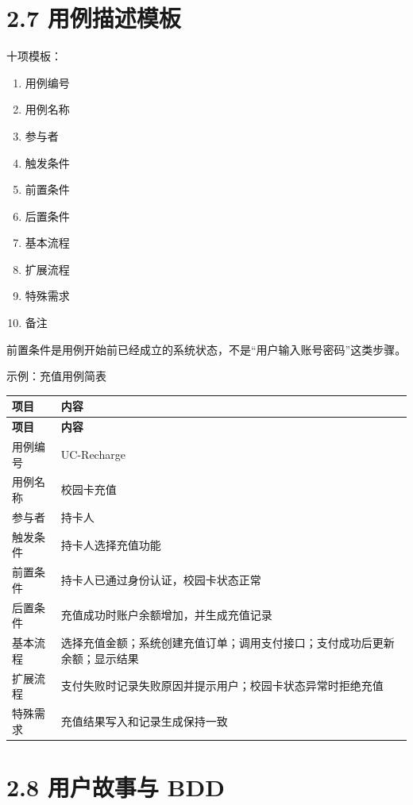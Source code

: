 \documentclass[UTF8,zihao=-4]{ctexart}
\begin{document}
\section{2.7 用例描述模板}

十项模板：

\begin{enumerate}
\item 用例编号
\item 用例名称
\item 参与者
\item 触发条件
\item 前置条件
\item 后置条件
\item 基本流程
\item 扩展流程
\item 特殊需求
\item 备注
\end{enumerate}

前置条件是用例开始前已经成立的系统状态，不是“用户输入账号密码”这类步骤。

示例：充值用例简表

{
\footnotesize
\begin{longtable}{|>{\raggedright\arraybackslash}p{}|>{\raggedright\arraybackslash}p{}|}
\hline
\textbf{项目} & \textbf{内容} \\
\hline
\endfirsthead
\hline
\textbf{项目} & \textbf{内容} \\
\hline
\endhead
用例编号 & UC-Recharge \\
\hline
用例名称 & 校园卡充值 \\
\hline
参与者 & 持卡人 \\
\hline
触发条件 & 持卡人选择充值功能 \\
\hline
前置条件 & 持卡人已通过身份认证，校园卡状态正常 \\
\hline
后置条件 & 充值成功时账户余额增加，并生成充值记录 \\
\hline
基本流程 & 选择充值金额；系统创建充值订单；调用支付接口；支付成功后更新余额；显示结果 \\
\hline
扩展流程 & 支付失败时记录失败原因并提示用户；校园卡状态异常时拒绝充值 \\
\hline
特殊需求 & 充值结果写入和记录生成保持一致 \\
\hline
\end{longtable}
}


\section{2.8 用户故事与 BDD}
\end{document}
